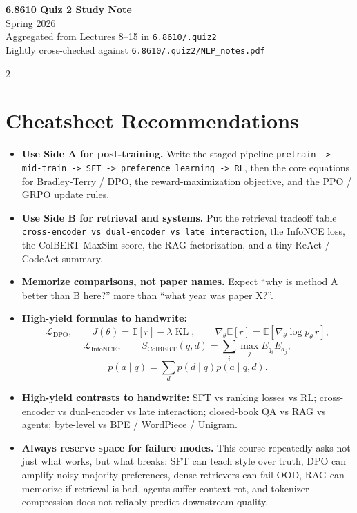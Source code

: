 \documentclass[10pt]{article}
\newcommand{\KL}{\operatorname{KL}}
\newcommand{\InfoNCE}{\operatorname{InfoNCE}}
\newcommand{\E}{\mathbb{E}}
\begin{document}
\small

\begin{center}
{\Large \textbf{6.8610 Quiz 2 Study Note}}\\
Spring 2026\\
Aggregated from Lectures 8--15 in \texttt{6.8610/.quiz2}\\
Lightly cross-checked against \texttt{6.8610/.quiz2/NLP\_notes.pdf}
\end{center}

\begin{multicols*}{2}
\raggedcolumns

\section*{Cheatsheet Recommendations}
\begin{itemize}
\item \textbf{Use Side A for post-training.} Write the staged pipeline \texttt{pretrain -> mid-train -> SFT -> preference learning -> RL}, then the core equations for Bradley-Terry / DPO, the reward-maximization objective, and the PPO / GRPO update rules.
\item \textbf{Use Side B for retrieval and systems.} Put the retrieval tradeoff table \texttt{cross-encoder vs dual-encoder vs late interaction}, the InfoNCE loss, the ColBERT MaxSim score, the RAG factorization, and a tiny ReAct / CodeAct summary.
\item \textbf{Memorize comparisons, not paper names.} Expect ``why is method A better than B here?'' more than ``what year was paper X?''.
\item \textbf{High-yield formulas to handwrite:}
\[
\mathcal{L}_{\mathrm{DPO}},
\qquad
J(\theta)=\E[r]-\lambda \KL,
\qquad
\nabla_\theta \E[r]=\E[\nabla_\theta \log p_\theta \, r],
\]
\[
\mathcal{L}_{\InfoNCE},
\qquad
S_{\mathrm{ColBERT}}(q,d)=\sum_i \max_j E_{q_i}^{\top} E_{d_j},
\]
\[
p(a \mid q)=\sum_d p(d \mid q)p(a \mid q,d).
\]
\item \textbf{High-yield contrasts to handwrite:} SFT vs ranking losses vs RL; cross-encoder vs dual-encoder vs late interaction; closed-book QA vs RAG vs agents; byte-level vs BPE / WordPiece / Unigram.
\item \textbf{Always reserve space for failure modes.} This course repeatedly asks not just what works, but what breaks: SFT can teach style over truth, DPO can amplify noisy majority preferences, dense retrievers can fail OOD, RAG can memorize if retrieval is bad, agents suffer context rot, and tokenizer compression does not reliably predict downstream quality.

\end{itemize}
\end{multicols*}
\end{document}
